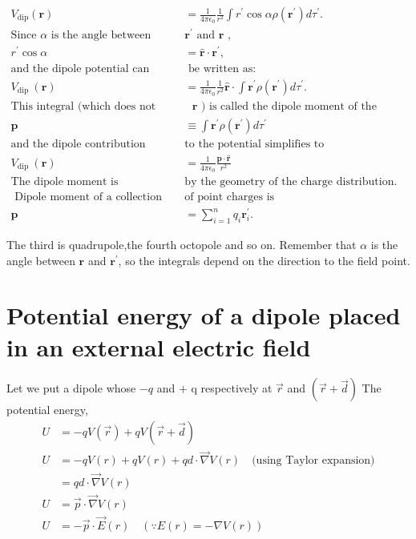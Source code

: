 \begin{align*}
V_{\mathrm{dip}}(\mathbf{r})&=\frac{1}{4 \pi \epsilon_{0}} \frac{1}{r^{2}} \int r^{\prime} \cos \alpha \rho\left(\mathbf{r}^{\prime}\right) d \tau^{\prime} .\\
\text{Since $\alpha$ is the angle between }&\text{$\mathbf{r}^{\prime}$ and $\mathbf{r}$ ,}\\
r^{\prime} \cos \alpha&=\hat{\mathbf{r}} \cdot \mathbf{r}^{\prime},\\
\text{and the dipole potential can}&\text{ be written as:}\\
V_{\text {dip }}(\mathbf{r})&=\frac{1}{4 \pi \epsilon_{0}} \frac{1}{r^{2}} \hat{\mathbf{r}} \cdot \int \mathbf{r}^{\prime} \rho\left(\mathbf{r}^{\prime}\right) d \tau^{\prime} .\\
\text{This integral (which does not depend on}&\text{ $\mathbf{r}$ ) is called the dipole moment of the distribution:}\\
\mathbf{p} &\equiv \int \mathbf{r}^{\prime} \rho\left(\mathbf{r}^{\prime}\right) d \tau^{\prime}\\
\text{and the dipole contribution }&\text{to the potential simplifies to}\\
V_{\text {dip }}(\mathbf{r})&=\frac{1}{4 \pi \epsilon_{0}} \frac{\mathbf{p} \cdot \hat{\mathbf{r}}}{r^{2}}\\
\text{The dipole moment is determined }&\text{by the geometry of the charge distribution.}\\
\text{ Dipole moment of a collection }&\text{of point charges is}\\
\mathbf{p}&=\sum_{i=1}^{n} q_{i} \mathbf{r}_{i}^{\prime} .
\end{align*}
\begin{note}
	The third is quadrupole,the fourth octopole and so on. Remember that $\alpha$ is the angle between $\mathbf{r}$ and $\mathbf{r}^{\prime}$, so the integrals depend on the direction to the field point.
\end{note}
\section{Potential energy of a dipole placed in an external electric field}
Let we put a dipole whose $-q$ and $+$ q respectively at $\vec{r}$ and $(\vec{r}+\vec{d})$
The potential energy,
\begin{align*}
U&=-q V(\vec{r})+q V(\vec{r}+\vec{d})\\
U&=-q V(r)+q V(r)+q d \cdot \vec{\nabla} V(r)\quad \text{(using Taylor expansion)}\\
&=q d \cdot \vec{\nabla} V(r) \\
U&=\vec{p} \cdot \vec{\nabla} V(r) \\
U&=-\vec{p} \cdot \vec{E}(r) \quad(\because E(r)=-\nabla V(r))
\end{align*}
